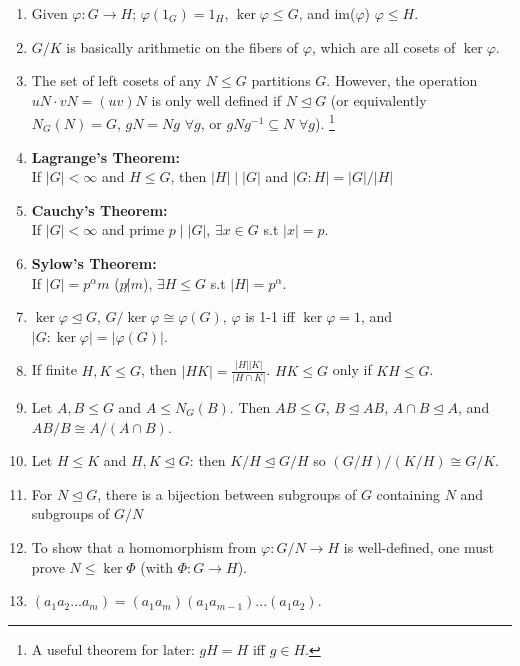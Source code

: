 \documentclass{article}
\begin{document}
\begin{enumerate}[1.]
    \item Given $\varphi : G \rightarrow H$; $\varphi(1_G) = 1_H$,
        $\ker \varphi \leq G$, and im($\varphi$) $\varphi \leq H$.
    \item $G/K$ is basically arithmetic on the fibers of $\varphi$, which
        are all cosets of $\ker \varphi$.
    \item The set of left cosets of any $N \leq G$ partitions $G$. However,
        the operation $uN \cdot vN = (uv)N$ is only well defined if $N
        \trianglelefteq G$ (or equivalently $N_G(N) = G$, $gN = Ng$ $\forall
        g$, or $gNg^{-1} \subseteq N$ $\forall g$).
        \footnote{A useful theorem for later: $gH = H$ iff $g \in H$.}
    \item {\bf Lagrange's Theorem:} \\
        If $|G| < \infty$ and $H \leq G$, then $|H| \mid |G|$ and
        $|G : H| = |G|/|H|$
    \item {\bf Cauchy's Theorem:} \\
        If $|G| < \infty$ and prime $p \mid |G|$, $\exists x \in G$ s.t $|x| =
        p$.
    \item {\bf Sylow's Theorem:} \\
        If $|G| = p^{\alpha}m$ ($p \not| m$), $\exists H \leq G$ s.t $|H|
        = p^{\alpha}$.
    \item $\ker \varphi \trianglelefteq G$, $G/\ker \varphi \cong
        \varphi(G)$, $\varphi$ is 1-1 iff $\ker \varphi = 1$, and
        $|G : \ker \varphi| = |\varphi(G)|$.
    \item If finite $H, K \leq G$, then $|HK| = \frac{|H||K|}{|H \cap K|}$.
        $HK \leq G$ only if $KH \leq G$.
    \item Let $A,B \leq G$ and $A \leq N_G(B)$. Then $AB \leq G$, $B
        \trianglelefteq AB$, $A \cap B \trianglelefteq A$, and $AB/B \cong
        A/(A \cap B)$.
    \item Let $H \leq K$ and $H,K \trianglelefteq G$: then $K/H
        \trianglelefteq G/H$ so $(G/H)/(K/H) \cong G/K$.
    \item For $N \trianglelefteq G$, there is a bijection between subgroups of
    $G$ containing $N$ and subgroups of $G/N$
    \item To show that a homomorphism from $\varphi : G/N \rightarrow H$ is
        well-defined, one must prove $N \leq \ker \Phi$ (with $\Phi : G
        \rightarrow H$).
    \item $(a_1 a_2 ... a_m) = (a_1 a_m)(a_1 a_{m-1})...(a_1 a_2)$.

\end{enumerate}
\end{document}
